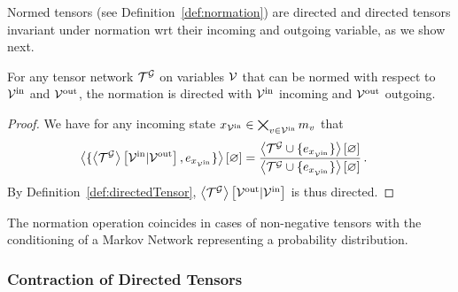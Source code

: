 Normed tensors (see Definition~\ref{def:normation}) are directed and directed tensors invariant under normation wrt their incoming and outgoing variable, as we show next.

\begin{theorem}\label{the:normationDirected}
	For any tensor network $\mathcal{T}^{\mathcal{G}}$ on variables $\mathcal{V}$ that can be normed with respect to $\mathcal{V}^{\mathrm{in}}$ and $\mathcal{V}^{\mathrm{out}}$, the normation is directed with $\mathcal{V}^{\mathrm{in}}$ incoming and $\mathcal{V}^{\mathrm{out}}$ outgoing.
\end{theorem}
\begin{proof}
	We have for any incoming state ${x_{\mathcal{V}^{\mathrm{in}}}\in\bigtimes_{v\in\mathcal{V}^{\mathrm{in}}}m_{v}}$ that
	\begin{align*}
		\left\langle \{\left\langle \mathcal{T}^{\mathcal{G}}\right\rangle \left[ \mathcal{V}^{\mathrm{in}} | \mathcal{V}^{\mathrm{out}} \right], e_{x_{\mathcal{V}^{\mathrm{in}}}} \}\right\rangle \left[ \varnothing \right] 
		& =  \frac{
		\left\langle \mathcal{T}^{\mathcal{G}}\cup\{e_{x_{\mathcal{V}^{\mathrm{in}}}}\}\right\rangle \left[ \varnothing \right]
		}{
		\left\langle \mathcal{T}^{\mathcal{G}}\cup\{e_{x_{\mathcal{V}^{\mathrm{in}}}}\}\right\rangle \left[ \varnothing \right]
		} \, .
	\end{align*}
	By Definition~\ref{def:directedTensor}, $\left\langle \mathcal{T}^{\mathcal{G}}\right\rangle \left[ \mathcal{V}^{\mathrm{out}} | \mathcal{V}^{\mathrm{in}} \right]$ is thus directed.
%
\end{proof}


The normation operation coincides in cases of non-negative tensors with the conditioning of a Markov Network representing a probability distribution.


\subsubsection{Contraction of Directed Tensors}

